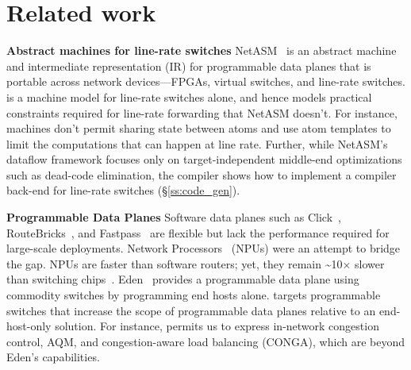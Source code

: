\section{Related work}
\label{s:related}

\textbf{Abstract machines for line-rate switches}
NetASM~\cite{netasm} is an abstract machine and intermediate representation
(IR) for programmable data planes that is portable across network
devices---FPGAs, virtual switches, and line-rate switches.  \absmachine is a
machine model for line-rate switches alone, and hence models practical
constraints required for line-rate forwarding that NetASM doesn't. For
instance, \absmachine machines don't permit sharing state between atoms and use
atom templates to limit the computations that can happen at line rate. Further,
while NetASM's dataflow framework focuses only on target-independent middle-end
optimizations such as dead-code elimination, the \pktlanguage compiler shows
how to implement a compiler back-end for line-rate switches
(\S\ref{ss:code_gen}).

\textbf{Programmable Data Planes}
Software data planes such as Click~\cite{click},
RouteBricks~\cite{routebricks}, and Fastpass~\cite{fastpass} are flexible but
lack the performance required for large-scale deployments. Network
Processors~\cite{ixp2800, ixp4xx} (NPUs) were an attempt to bridge the gap.
NPUs are faster than software routers; yet, they remain
\textasciitilde10$\times$ slower than switching chips~\cite{rmt}.
Eden~\cite{eden} provides a programmable data plane using commodity switches by
programming end hosts alone. \pktlanguage targets programmable switches that
increase the scope of programmable data planes relative to an end-host-only
solution. For instance, \pktlanguage permits us to express in-network
congestion control, AQM, and congestion-aware load balancing (CONGA), which are
beyond Eden's capabilities.

